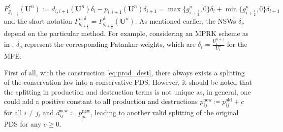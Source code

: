 \documentclass[final,11pt, times, linenumber, nopreprintline]{elsarticle}
\newcommand{\bU}{\bm U}
\begin{document}
\begin{equation}
	F^{\delta}_{g_{i+\frac{1}{2}}}(\bU^n):= d_{i,i+1}(\bU^n) \delta_i - p_{i, i+1}(\bU^n) \delta_{i+1} = \max \lbrace g^{n}_{i+\frac12},0 \rbrace \delta_i + \min \lbrace g^n_{i+\frac12},0\rbrace  \delta_{i+1} %
	\label{eq:flux_one_st}
\end{equation}
and the short notation $F^{n,\delta}_{g_{i+\frac{1}{2}}} = F^{\delta}_{g_{i+\frac{1}{2}}}(\bU^n).$
As mentioned earlier, the NSWs $\delta_\nu$ depend on the particular method. For example, considering an MPRK scheme as in \cite{kopecz_order_2018}, $\delta_\nu$ represent the corresponding Patankar weights, which are $\delta_i=\frac{U_i^{n+1}}{U_i^n}$ for the MPE. 

\begin{rmk}\label{rem:other_splittings} First of all, with the construction \eqref{eq:prod_dest}, there always exists a splitting of the conservation law into a conservative PDS. However, it should be noted that the splitting in production and destruction terms is not unique as, in general, one could add a positive constant to all production and destructions $p^{\text{new}}_{ij}\coloneqq p^{\text{old}}_{ij} + c$ for all $i\neq j$, and $d^{\text{new}}_{ij}\coloneqq p^{\text{new}}_{ji}$, leading to another valid splitting of the original PDS for any $c\geq 0$.
	

\end{rmk}
\end{document}
